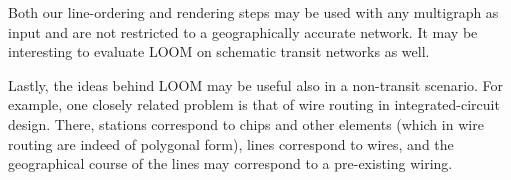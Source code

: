 \documentclass[format=acmsmall, review=false, screen=true]{acmart}
\newcommand\TODO[1]{\textcolor{blue}{\small [TODO: #1]}}
\begin{document}
Both our line-ordering and rendering steps may be used with any multigraph as input and are not restricted to a geographically accurate network. It may be interesting to evaluate LOOM on schematic transit networks as well.

Lastly, the ideas behind LOOM may be useful also in a non-transit scenario.
For example, one closely related problem is that of wire routing in integrated-circuit design.
There, stations correspond to chips and other elements (which in wire routing are indeed of polygonal form), lines correspond to wires, and the geographical course of the lines may correspond to a pre-existing wiring.


%
%
%



\end{document}
